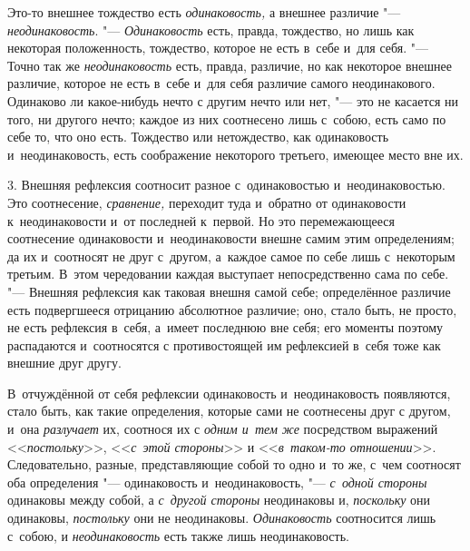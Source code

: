 Это-то внешнее тождество есть {\em одинаковость,} а
внешнее различие "--- {\em неодинаковость}. "---
{\em Одинаковость} есть, правда, тождество, но лишь как
некоторая положенность, тождество, которое не есть в~себе и~для себя. "---
Точно так же {\em неодинаковость} есть, правда,
различие, но как некоторое внешнее различие, которое не есть в~себе и~для
себя различие самого неодинакового. Одинаково ли какое-нибудь нечто с
другим нечто или нет, "--- это не касается ни того, ни другого нечто; каждое
из них соотнесено лишь с~собою, есть само по себе то, что оно есть.
Тождество или нетождество, как одинаковость и~неодинаковость, есть
соображение некоторого третьего, имеющее место вне их.

3. Внешняя рефлексия соотносит разное с~одинаковостью и~неодинаковостью. Это
соотнесение, {\em сравнение,} переходит туда и~обратно
от одинаковости к~неодинаковости и~от последней к~первой. Но это
перемежающееся соотнесение одинаковости и~неодинаковости внешне самим этим
определениям; да их и~соотносят не друг с~другом, а~каждое самое по себе
лишь с~некоторым третьим. В~этом чередовании каждая выступает
непосредственно сама по себе. "--- Внешняя рефлексия как таковая внешня самой
себе; определённое различие есть подвергшееся отрицанию абсолютное
различие; оно, стало быть, не просто, не есть рефлексия в~себя, а~имеет
последнюю вне себя; его моменты поэтому распадаются и~соотносятся с
противостоящей им рефлексией в~себя тоже как внешние друг другу.

В~отчуждённой от себя рефлексии одинаковость и~неодинаковость появляются,
стало быть, как такие определения, которые сами не соотнесены друг с
другом, и~она {\em разлучает} их, соотнося их с
{\em одним и~тем же} посредством выражений <<{\em постольку}>>,
<<{\em с~этой стороны}>> и <<{\em в~таком-то отношении}>>.
Следовательно, разные, представляющие собой то одно и~то же, с~чем
соотносят оба определения "--- одинаковость и~неодинаковость, "---
{\em с~одной стороны} одинаковы между собой, а
{\em с~другой стороны} неодинаковы и,
{\em поскольку} они одинаковы, {\em постольку} они не неодинаковы.
{\em Одинаковость} соотносится лишь с~собою, и
{\em неодинаковость} есть также лишь неодинаковость.

